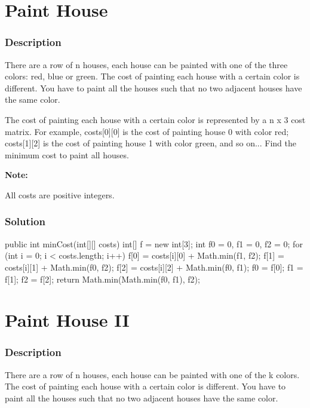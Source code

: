 \newpage

\section{Paint House} %

\subsubsection{Description}
There are a row of n houses, each house can be painted with one of the three colors: red, blue or green. The cost of painting each house with a certain color is different. You have to paint all the houses such that no two adjacent houses have the same color.

The cost of painting each house with a certain color is represented by a n x 3 cost matrix. For example, costs[0][0] is the cost of painting house 0 with color red; costs[1][2] is the cost of painting house 1 with color green, and so on... Find the minimum cost to paint all houses.

\textbf{Note:}

All costs are positive integers.

\subsubsection{Solution}

\begin{Code}
public int minCost(int[][] costs) {
    int[] f = new int[3];
    int f0 = 0, f1 = 0, f2 = 0;
    for (int i = 0; i < costs.length; i++) {
        f[0] = costs[i][0] + Math.min(f1, f2);
        f[1] = costs[i][1] + Math.min(f0, f2);
        f[2] = costs[i][2] + Math.min(f0, f1);
        f0 = f[0]; f1 = f[1]; f2 = f[2];
    }
    return Math.min(Math.min(f0, f1), f2);
}
\end{Code}

\newpage

\section{Paint House II} %

\subsubsection{Description}
There are a row of n houses, each house can be painted with one of the k colors. The cost of painting each house with a certain color is different. You have to paint all the houses such that no two adjacent houses have the same color.

